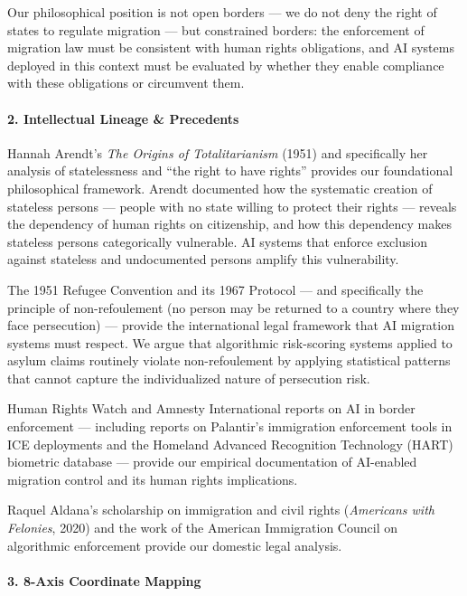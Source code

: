 Our philosophical position is not open borders --- we do not deny the
right of states to regulate migration --- but constrained borders: the
enforcement of migration law must be consistent with human rights
obligations, and AI systems deployed in this context must be evaluated
by whether they enable compliance with these obligations or circumvent
them.

\paragraph{2. Intellectual Lineage \&
Precedents}\label{intellectual-lineage-precedents-49}

Hannah Arendt's \emph{The Origins of Totalitarianism} (1951) and
specifically her analysis of statelessness and ``the right to have
rights'' provides our foundational philosophical framework. Arendt
documented how the systematic creation of stateless persons --- people
with no state willing to protect their rights --- reveals the dependency
of human rights on citizenship, and how this dependency makes stateless
persons categorically vulnerable. AI systems that enforce exclusion
against stateless and undocumented persons amplify this vulnerability.

The 1951 Refugee Convention and its 1967 Protocol --- and specifically
the principle of non-refoulement (no person may be returned to a country
where they face persecution) --- provide the international legal
framework that AI migration systems must respect. We argue that
algorithmic risk-scoring systems applied to asylum claims routinely
violate non-refoulement by applying statistical patterns that cannot
capture the individualized nature of persecution risk.

Human Rights Watch and Amnesty International reports on AI in border
enforcement --- including reports on Palantir's immigration enforcement
tools in ICE deployments and the Homeland Advanced Recognition
Technology (HART) biometric database --- provide our empirical
documentation of AI-enabled migration control and its human rights
implications.

Raquel Aldana's scholarship on immigration and civil rights
(\emph{Americans with Felonies}, 2020) and the work of the American
Immigration Council on algorithmic enforcement provide our domestic
legal analysis.

\paragraph{3. 8-Axis Coordinate
Mapping}\label{axis-coordinate-mapping-49}

